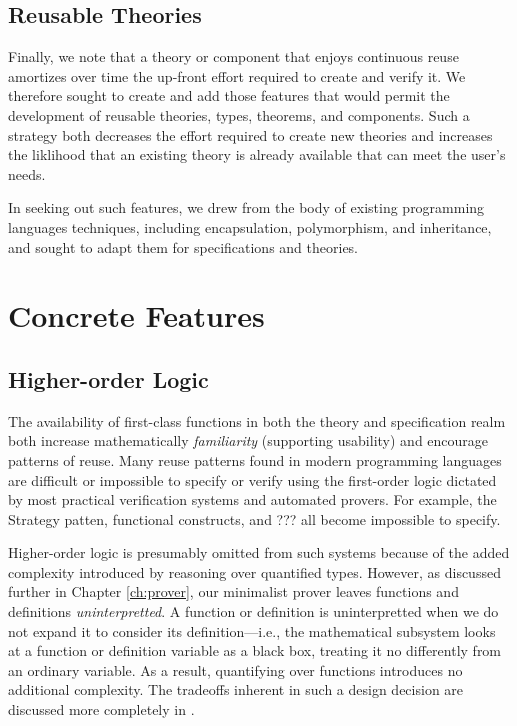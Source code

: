 	\subsection{Reusable Theories\label{reusableTheories}}

Finally, we note that a theory or component that enjoys continuous reuse amortizes over time the up-front effort required to create and verify it.  We therefore sought to create and add those features that would permit the development of reusable theories, types, theorems, and components.  Such a strategy both decreases the effort required to create new theories and increases the liklihood that an existing theory is already available that can meet the user's needs.

In seeking out such features, we drew from the body of existing programming languages techniques, including encapsulation, polymorphism, and inheritance, and sought to adapt them for specifications and theories.

\section{Concrete Features\label{mathFeatures}}

	\subsection{Higher-order Logic\label{higherOrderLogic}}

The availability of first-class functions in both the theory and specification realm both increase mathematically \emph{familiarity} (supporting usability) and encourage patterns of reuse.  Many reuse patterns found in modern programming languages are difficult or impossible to specify or verify using the first-order logic dictated by most practical verification systems and automated provers.  For example, the Strategy patten, functional constructs, and ??? all become impossible to specify.

Higher-order logic is presumably omitted from such systems because of the added complexity introduced by reasoning over quantified types.  However, as discussed further in Chapter \ref{ch:prover}, our minimalist prover leaves functions and definitions \emph{uninterpretted}.  A function or definition is uninterpretted when we do not expand it to consider its definition---i.e., the mathematical subsystem looks at a function or definition variable as a black box, treating it no differently from an ordinary variable.  As a result, quantifying over functions introduces no additional complexity.  The tradeoffs inherent in such a design decision are discussed more completely in \cite{tagoreExpand}.

